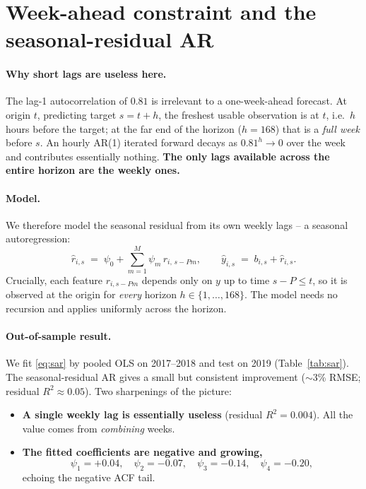 \documentclass[11pt]{article}
\begin{document}
\section{Week-ahead constraint and the seasonal-residual AR}
\label{sec:model}

\paragraph{Why short lags are useless here.} The lag-1 autocorrelation of $0.81$
is irrelevant to a one-week-ahead forecast. At origin $t$, predicting target
$s=t+h$, the freshest usable observation is at $t$, i.e.\ $h$ hours before the
target; at the far end of the horizon ($h=168$) that is a \emph{full week}
before $s$. An hourly AR(1) iterated forward decays as $0.81^{h}\!\to\!0$ over
the week and contributes essentially nothing. \textbf{The only lags available
across the entire horizon are the weekly ones.}

\paragraph{Model.} We therefore model the seasonal residual from its own weekly
lags -- a seasonal autoregression:
\begin{equation}
\hat r_{i,s} \;=\; \psi_0 + \sum_{m=1}^{M}\psi_m\, r_{i,\,s-Pm},
\qquad
\hat y_{i,s} \;=\; b_{i,s} + \hat r_{i,s}.
\label{eq:sar}
\end{equation}
Crucially, each feature $r_{i,s-Pm}$ depends only on $y$ up to time $s-P\le t$,
so it is observed at the origin for \emph{every} horizon $h\in\{1,\dots,168\}$.
The model needs no recursion and applies uniformly across the horizon.

\paragraph{Out-of-sample result.} We fit \eqref{eq:sar} by pooled OLS on
2017--2018 and test on 2019 (Table~\ref{tab:sar}). The seasonal-residual AR gives
a small but consistent improvement ($\sim$3\% RMSE; residual $R^2\approx0.05$).
Two sharpenings of the picture:
\begin{itemize}
\item \textbf{A single weekly lag is essentially useless} (residual
  $R^2=0.004$). All the value comes from \emph{combining} weeks.
\item \textbf{The fitted coefficients are negative and growing,}
  \[
  \psi_1=+0.04,\quad \psi_2=-0.07,\quad \psi_3=-0.14,\quad \psi_4=-0.20,
  \]
  echoing the negative ACF tail.
\end{itemize}
\end{document}
